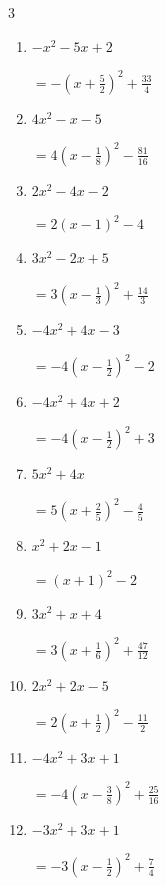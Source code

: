 \begin{multicols}{3}
\begin{enumerate}
  \item $-x^{2}-5x+2$

        $\displaystyle =-\left( x+\frac{5}{2}\right)^{2}+\frac{33}{4}$

  \item $4x^{2}-x-5$

        $\displaystyle =4\left( x-\frac{1}{8}\right)^{2}-\frac{81}{16}$

  \item $2x^{2}-4x-2$

        $\displaystyle =2\left( x-1\right)^{2}-4$

  \item $3x^{2}-2x+5$

        $\displaystyle =3\left( x-\frac{1}{3}\right)^{2}+\frac{14}{3}$

\columnbreak %

  \item $-4x^{2}+4x-3$

        $\displaystyle =-4\left( x-\frac{1}{2}\right)^{2}-2$

  \item $-4x^{2}+4x+2$

        $\displaystyle =-4\left( x-\frac{1}{2}\right)^{2}+3$

  \item $5x^{2}+4x$

        $\displaystyle =5\left( x+\frac{2}{5}\right)^{2}-\frac{4}{5}$

  \item $x^{2}+2x-1$

        $\displaystyle =\left( x+1\right)^{2}-2$

  \item $3x^{2}+x+4$

        $\displaystyle =3\left( x+\frac{1}{6}\right)^{2}+\frac{47}{12}$

\columnbreak %

\resetques

  \item $2x^{2}+2x-5$

        $\displaystyle =2\left( x+\frac{1}{2}\right)^{2}-\frac{11}{2}$

  \item $-4x^{2}+3x+1$

        $\displaystyle =-4\left( x-\frac{3}{8}\right)^{2}+\frac{25}{16}$

  \item $-3x^{2}+3x+1$

        $\displaystyle =-3\left( x-\frac{1}{2}\right)^{2}+\frac{7}{4}$


\end{enumerate}
\end{multicols}
